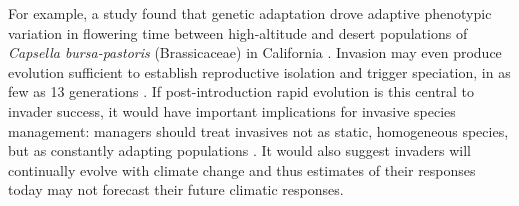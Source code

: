 \documentclass[11pt]{article}\usepackage[]{graphicx}\usepackage[]{color}
\begin{document}
	
    For example, a study found that genetic adaptation drove adaptive phenotypic variation in flowering time between high-altitude and desert populations of \textit{Capsella bursa-pastoris} (Brassicaceae) in California \parencite{Linde2001}. Invasion may even produce evolution sufficient to establish reproductive isolation and trigger speciation, in as few as 13 generations \parencite{Hendry2000}. If post-introduction rapid evolution is this central to invader success, it would have important implications for invasive species management: managers should treat invasives not as static, homogeneous species, but as constantly adapting populations \parencite{Lee2002invasion}. It would also suggest invaders will continually evolve with climate change and thus estimates of their responses today may not forecast their future climatic responses. 
	
\end{document}
